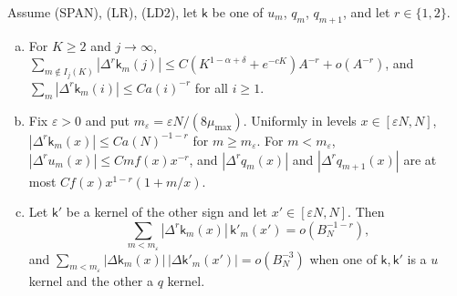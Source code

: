 \begin{lemma}\label{lem:tails}
Assume (SPAN), (LR), (LD2), let $\mathsf k$ be one of $u_m$, $q_m$, $q_{m+1}$, and let
$r\in\{1,2\}$.
\begin{enumerate}[(a)]
\item For $K\ge2$ and $j\to\infty$, $\sum_{m\notin I_j(K)}|\Delta^r\mathsf k_m(j)|\le C(K^{1-\alpha+\delta}+e^{-cK})A^{-r}+o(A^{-r})$,
and $\sum_m|\Delta^r\mathsf k_m(i)|\le Ca(i)^{-r}$ for all $i\ge1$.
\item Fix $\varepsilon>0$ and put $m_\varepsilon=\varepsilon N/(8\mu_{\max})$. Uniformly in levels
$x\in[\varepsilon N,N]$, $|\Delta^r\mathsf k_m(x)|\le Ca(N)^{-1-r}$ for $m\ge m_\varepsilon$. For
$m<m_\varepsilon$, $|\Delta^ru_m(x)|\le Cmf(x)x^{-r}$, and $|\Delta^rq_m(x)|$ and
$|\Delta^rq_{m+1}(x)|$ are at most $Cf(x)x^{1-r}(1+m/x)$.
\item Let $\mathsf k'$ be a kernel of the other sign and let $x'\in[\varepsilon N,N]$. Then
\[
 \sum_{m<m_\varepsilon}|\Delta^r\mathsf k_m(x)|\,\mathsf k'_m(x')=o(B_N^{-1-r}),
\]
and $\sum_{m<m_\varepsilon}|\Delta\mathsf k_m(x)|\,|\Delta\mathsf k'_m(x')|=o(B_N^{-3})$ when one
of $\mathsf k,\mathsf k'$ is a $u$ kernel and the other a $q$ kernel.
\end{enumerate}
\end{lemma}

